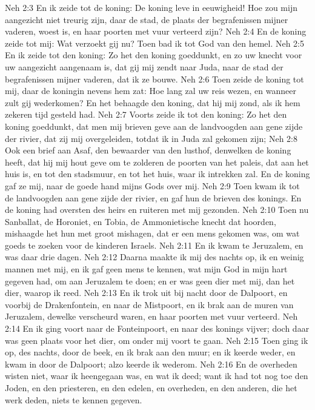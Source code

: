 Neh 2:3  En ik zeide tot de koning: De koning leve in eeuwigheid! Hoe zou mijn aangezicht niet treurig zijn, daar de stad, de plaats der begrafenissen mijner vaderen, woest is, en haar poorten met vuur verteerd zijn?
Neh 2:4  En de koning zeide tot mij: Wat verzoekt gij nu? Toen bad ik tot God van den hemel.
Neh 2:5  En ik zeide tot den koning: Zo het den koning goeddunkt, en zo uw knecht voor uw aangezicht aangenaam is, dat gij mij zendt naar Juda, naar de stad der begrafenissen mijner vaderen, dat ik ze bouwe.
Neh 2:6  Toen zeide de koning tot mij, daar de koningin nevens hem zat: Hoe lang zal uw reis wezen, en wanneer zult gij wederkomen? En het behaagde den koning, dat hij mij zond, als ik hem zekeren tijd gesteld had.
Neh 2:7  Voorts zeide ik tot den koning: Zo het den koning goeddunkt, dat men mij brieven geve aan de landvoogden aan gene zijde der rivier, dat zij mij overgeleiden, totdat ik in Juda zal gekomen zijn;
Neh 2:8  Ook een brief aan Asaf, den bewaarder van den lusthof, denwelken de koning heeft, dat hij mij hout geve om te zolderen de poorten van het paleis, dat aan het huis is, en tot den stadsmuur, en tot het huis, waar ik intrekken zal. En de koning gaf ze mij, naar de goede hand mijns Gods over mij.
Neh 2:9  Toen kwam ik tot de landvoogden aan gene zijde der rivier, en gaf hun de brieven des konings. En de koning had oversten des heirs en ruiteren met mij gezonden.
Neh 2:10  Toen nu Sanballat, de Horoniet, en Tobia, de Ammonietische knecht dat hoorden, mishaagde het hun met groot mishagen, dat er een mens gekomen was, om wat goeds te zoeken voor de kinderen Israels.
Neh 2:11  En ik kwam te Jeruzalem, en was daar drie dagen.
Neh 2:12  Daarna maakte ik mij des nachts op, ik en weinig mannen met mij, en ik gaf geen mens te kennen, wat mijn God in mijn hart gegeven had, om aan Jeruzalem te doen; en er was geen dier met mij, dan het dier, waarop ik reed.
Neh 2:13  En ik trok uit bij nacht door de Dalpoort, en voorbij de Drakenfontein, en naar de Mistpoort, en ik brak aan de muren van Jeruzalem, dewelke verscheurd waren, en haar poorten met vuur verteerd.
Neh 2:14  En ik ging voort naar de Fonteinpoort, en naar des konings vijver; doch daar was geen plaats voor het dier, om onder mij voort te gaan.
Neh 2:15  Toen ging ik op, des nachts, door de beek, en ik brak aan den muur; en ik keerde weder, en kwam in door de Dalpoort; alzo keerde ik wederom.
Neh 2:16  En de overheden wisten niet, waar ik heengegaan was, en wat ik deed; want ik had tot nog toe den Joden, en den priesteren, en den edelen, en overheden, en den anderen, die het werk deden, niets te kennen gegeven.

